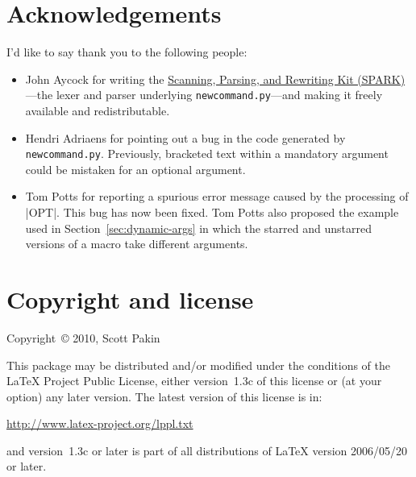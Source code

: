 \documentclass{ltxdoc}
\newcommand*{\ncpy}{\texttt{newcommand.py}}      %
\begin{document}
\section{Acknowledgements}

I'd like to say thank you to the following people:

\begin{itemize}
  \item John Aycock for writing the
    \href{http://pages.cpsc.ucalgary.ca/~aycock/spark/}{Scanning,
      Parsing, and Rewriting Kit (SPARK)}---the lexer and parser
    underlying \ncpy---and making it freely available and
    redistributable.

  \item Hendri Adriaens for pointing out a bug in the code generated
    by \ncpy.  Previously, bracketed text within a mandatory argument
    could be mistaken for an optional argument.

  \item Tom Potts for reporting a spurious error message caused by the
    processing of |OPT|.  This bug has now been fixed.  Tom Potts also
    proposed the example used in Section~\ref{sec:dynamic-args} in
    which the starred and unstarred versions of a macro take different
    arguments.
\end{itemize}


\section{Copyright and license}

Copyright~\copyright{} 2010, Scott Pakin

\bigskip

This package may be distributed and/or modified under the conditions
of the \LaTeX{} Project Public License, either version~1.3c of this
license or (at your option) any later version.  The latest version of
this license is in:

\begin{center}
  \url{http://www.latex-project.org/lppl.txt}
\end{center}

\noindent
and version~1.3c or later is part of all distributions of \LaTeX{}
version 2006/05/20 or later.
\end{document}
